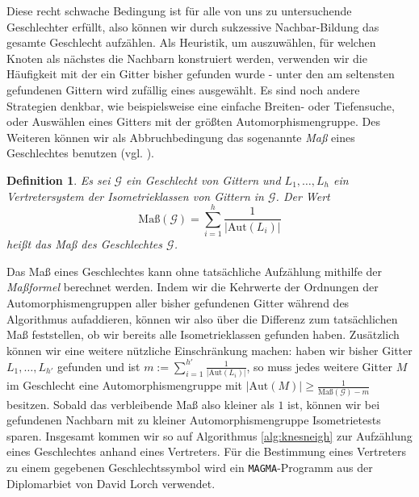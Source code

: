 \documentclass[12pt,a4paper,halfparskip,headsepline,bibtotocnumbered]{scrreprt}
\theoremstyle{nummermitklammern}
\newtheorem{definition}[defsatzusw]{Definition}
\theoremstyle{nonumberbreak}
\begin{document}
Diese recht schwache Bedingung ist für alle von uns zu untersuchende Geschlechter erfüllt, also können wir durch sukzessive Nachbar-Bildung das gesamte Geschlecht aufzählen. Als Heuristik, um auszuwählen, für welchen Knoten als nächstes die Nachbarn konstruiert werden, verwenden wir die Häufigkeit mit der ein Gitter bisher gefunden wurde - unter den am seltensten gefundenen Gittern wird zufällig eines ausgewählt. Es sind noch andere Strategien denkbar, wie beispielsweise eine einfache Breiten- oder Tiefensuche, oder Auswählen eines Gitters mit der größten Automorphismengruppe. Des Weiteren können wir als Abbruchbedingung das sogenannte \textit{Maß} eines Geschlechtes benutzen (vgl. \cite[Abschnitt 35]{kneser}).

\begin{framed}
	\begin{definition}
		Es sei $\mathcal{G}$ ein Geschlecht von Gittern und $L_1, \dots, L_h$ ein Vertretersystem der Isometrieklassen von Gittern in $\mathcal{G}$. Der Wert
		\begin{equation*}
			\text{Maß}(\mathcal{G}) = \sum_{i=1}^h \frac{1}{\vert \text{Aut}(L_i) \vert}
		\end{equation*}
		heißt das \textit{Maß} des Geschlechtes $\mathcal{G}$.
	\end{definition}
\end{framed}

Das Maß eines Geschlechtes kann ohne tatsächliche Aufzählung mithilfe der \textit{Maßformel} berechnet werden. Indem wir die Kehrwerte der Ordnungen der Automorphismengruppen aller bisher gefundenen Gitter während des Algorithmus aufaddieren, können wir also über die Differenz zum tatsächlichen Maß feststellen, ob wir bereits alle Isometrieklassen gefunden haben. Zusätzlich können wir eine weitere nützliche Einschränkung machen: haben wir bisher Gitter $L_1, \dots, L_{h'}$ gefunden und ist $m := \sum_{i=1}^{h'} \frac{1}{\vert \text{Aut}(L_i) \vert}$, so muss jedes weitere Gitter $M$ im Geschlecht eine Automorphismengruppe mit $\vert \text{Aut}(M) \vert \geq \frac{1}{\text{Maß}(\mathcal{G}) - m}$ besitzen. Sobald das verbleibende Maß also kleiner als $1$ ist, können wir bei gefundenen Nachbarn mit zu kleiner Automorphismengruppe Isometrietests sparen. Insgesamt kommen wir so auf Algorithmus \eqref{alg:knesneigh} zur Aufzählung eines Geschlechtes anhand eines Vertreters. Für die Bestimmung eines Vertreters zu einem gegebenen Geschlechtssymbol wird ein \texttt{MAGMA}-Programm aus der Diplomarbiet von David Lorch \cite{lorch} verwendet.
\end{document}
